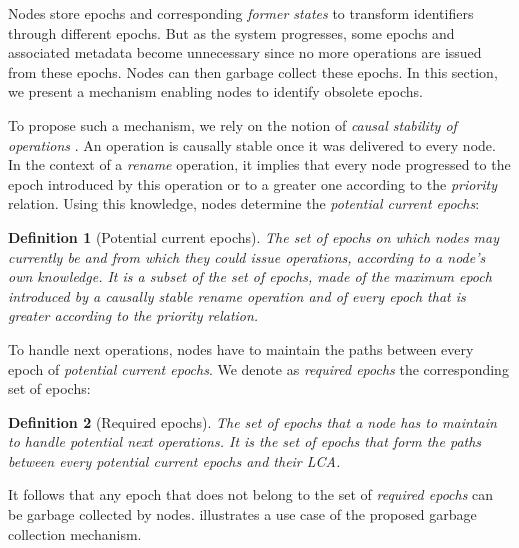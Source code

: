 \documentclass[10pt,journal,compsoc]{IEEEtran}
\newtheorem{definition}{Definition}
\begin{document}
Nodes store epochs and corresponding \emph{former states} to transform identifiers through different epochs.
But as the system progresses, some epochs and associated metadata become unnecessary since no more operations are issued from these epochs.
Nodes can then garbage collect these epochs.
In this section, we present a mechanism enabling nodes to identify obsolete epochs.

To propose such a mechanism, we rely on the notion of \emph{causal stability of operations} \cite{10.1007/978-3-662-43352-2_11}.
An operation is causally stable once it was delivered to every node.
In the context of a \emph{rename} operation, it implies that every node progressed to the epoch introduced by this operation or to a greater one according to the \emph{priority} relation.
Using this knowledge, nodes determine the \emph{potential current epochs}:

\begin{definition}[Potential current epochs]
    The set of epochs on which nodes may currently be and from which they could issue operations, according to a node's own knowledge.
    It is a subset of the set of epochs, made of the maximum epoch introduced by a causally stable \emph{rename} operation and of every epoch that is greater according to the \emph{priority} relation.
\end{definition}

To handle next operations, nodes have to maintain the paths between every epoch of \emph{potential current epochs}.
We denote as \emph{required epochs} the corresponding set of epochs:

\begin{definition}[Required epochs]
    The set of epochs that a node has to maintain to handle potential next operations.
    It is the set of epochs that form the paths between every \emph{potential current epochs} and their \ac{LCA}.
\end{definition}

It follows that any epoch that does not belong to the set of \emph{required epochs} can be garbage collected by nodes.
 illustrates a use case of the proposed garbage collection mechanism.
\end{document}
